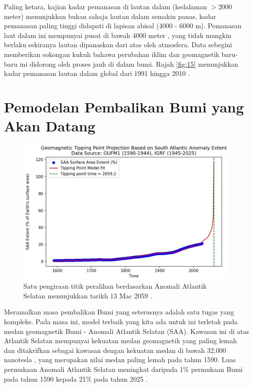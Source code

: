 \documentclass[10pt,twocolumn,letterpaper]{article}
\begin{document}
Paling ketara, kajian kadar pemanasan di lautan dalam (kedalaman $>$2000 meter) menunjukkan bukan sahaja lautan dalam semakin panas, kadar pemanasan paling tinggi didapati di lapisan abisal (4000 - 6000 m). Pemanasan laut dalam ini mempunyai pusat di bawah 4000 meter \cite{132,129}, yang tidak mungkin berlaku sekiranya lautan dipanaskan dari atas oleh atmosfera. Data sebegini memberikan sokongan kukuh bahawa perubahan iklim dan geomagnetik baru-baru ini didorong oleh proses jauh di dalam bumi. Rajah \ref{fig:15} menunjukkan kadar pemanasan lautan dalam global dari 1991 hingga 2010 \cite{132}.
\section{Pemodelan Pembalikan Bumi yang Akan Datang}

\begin{figure}[b]
\begin{center}
   \includegraphics[width=1\linewidth]{saa-crop.jpeg}
\end{center}
   \caption{Satu pengiraan titik peralihan berdasarkan Anomali Atlantik Selatan menunjukkan tarikh 13 Mac 2059 \cite{125,126}.}
\label{fig:16}
\label{fig:onecol}
\end{figure}

Meramalkan masa pembalikan Bumi yang seterusnya adalah satu tugas yang kompleks. Pada masa ini, model terbaik yang kita ada untuk ini terletak pada medan geomagnetik Bumi - Anomali Atlantik Selatan (SAA). Kawasan ini di atas Atlantik Selatan mempunyai kekuatan medan geomagnetik yang paling lemah dan ditakrifkan sebagai kawasan dengan kekuatan medan di bawah 32,000 nanotesla \cite{135}, yang merupakan nilai medan paling lemah pada tahun 1590. Luas permukaan Anomali Atlantik Selatan meningkat daripada 1\% permukaan Bumi pada tahun 1590 kepada 21\% pada tahun 2025 \cite{136}.
\end{document}
